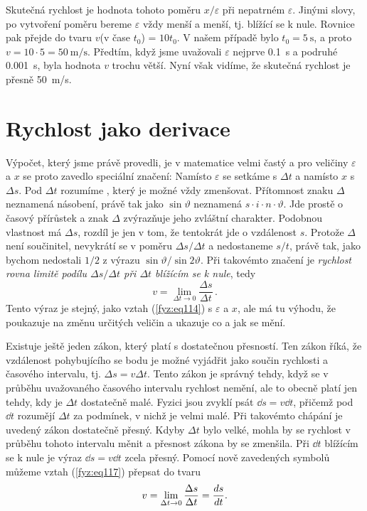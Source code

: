     Skutečná rychlost je hodnota tohoto poměru \(x/\varepsilon\) při nepatrném \(\varepsilon\). 
    Jinými slovy, po vytvoření poměru bereme \(\varepsilon\) vždy menší a menší, tj. blížící se k 
    nule. Rovnice pak přejde do tvaru \(v\)(v čase \(t_0\)) = \(10t_0\). V našem případě bylo \(t_0 
    = \SI{5}{\s}\), a proto \(v = 10\cdot5 = \SI{50}{\m/\s}\). Předtím, když jsme uvažovali 
    \(\varepsilon\) nejprve \SI{0.1}{\s} a podruhé \SI{0.001}{\s}, byla hodnota \(v\) trochu větší. 
    Nyní však vidíme, že skutečná rychlost je přesně \SI{50}{\m/\s}.
    
  \section{Rychlost jako derivace}
    Výpočet, který jsme právě provedli, je v matematice velmi častý a pro veličiny \(\varepsilon\) 
    a \(x\) se proto zavedlo speciální značení: Namísto \(\varepsilon\) se setkáme s \(\Delta t\) a 
    namísto \(x\) s \(\Delta s\). Pod \(\Delta t\) rozumíme , který je 
    možné vždy zmenšovat. Přítomnost znaku \(\Delta\) neznamená násobení, právě tak jako 
    \(\sin\vartheta\) neznamená \(s\cdot i \cdot n \cdot \vartheta\). Jde prostě o časový přírůstek 
    a znak \(\Delta\) zvýrazňuje jeho zvláštní charakter. Podobnou vlastnost má \(\Delta s\), 
    rozdíl je jen v tom, že tentokrát jde o vzdálenost \(s\). Protože \(\Delta\) není součinitel, 
    nevykrátí se v poměru \(\Delta s/\Delta t\) a nedostaneme \(s/t\), právě tak, jako bychom 
    nedostali \(1/2\) z výrazu \(\sin \vartheta/\sin2\vartheta\). Při takovémto značení je 
    \emph{rychlost rovna limitě podílu \(\Delta s/\Delta t\) při \(\Delta t\) blížícím se k nule}, 
    tedy
    \begin{equation}\label{fyz:eq117}
      \boxed{v = \lim_{\Delta t\to 0}{\frac{\Delta s}{\Delta t}}}\,.
    \end{equation}
    Tento výraz je stejný, jako vztah (\ref{fyz:eq114}) s \(\varepsilon\) a \(x\), ale má tu 
    výhodu, že poukazuje na změnu určitých veličin a ukazuje co a jak se mění.
    
    Existuje ještě jeden zákon, který platí s dostatečnou přesností. Ten zákon říká, že vzdálenost 
    pohybujícího se bodu je možné vyjádřit jako součin rychlosti a časového intervalu, tj. \(\Delta 
    s = v\Delta t\). Tento zákon je správný tehdy, když se v průběhu uvažovaného časového intervalu 
    rychlost nemění, ale to obecně platí jen tehdy, kdy je \(\Delta t\) dostatečně malé. Fyzici 
    jsou zvyklí psát \(\dd{s} = v\dd{t}\), přičemž pod \(\dd{t}\) rozumějí \(\Delta t\) za 
    podmínek, v nichž je velmi malé. Při takovémto chápání je uvedený zákon dostatečně přesný. 
    Kdyby \(\Delta t\) bylo velké, mohla by se rychlost v průběhu tohoto intervalu měnit a přesnost 
    zákona by se zmenšila. Při \(\dd{t}\) blížícím se k nule je výraz \(\dd{s} = v\dd{t}\) zcela 
    přesný. Pomocí nově zavedených symbolů můžeme vztah (\ref{fyz:eq117}) přepsat do tvaru
    \begin{equation}\label{fyz:eq118}
      v = \lim_{\Delta t\to 0}{\frac{\Delta s}{\Delta t}} = \dfrac{d s}{d t}.
    \end{equation}
    

